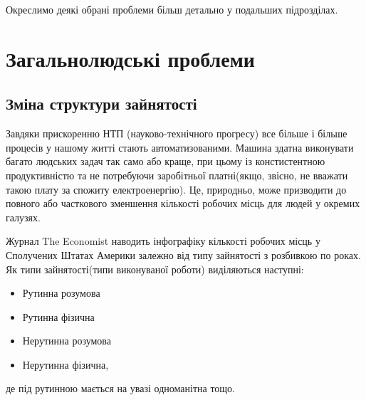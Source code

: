         Окреслимо деякі обрані проблеми більш детально у подальших підрозділах.

    \chapter{Загальнолюдські проблеми}\label{sec:world}


    \section{Зміна структури зайнятості}

        Завдяки прискоренню НТП (науково-технічного прогресу) все більше і більше процесів 
        у нашому житті стають автоматизованими. Машина здатна виконувати багато людських задач так само або краще,
        при цьому із констистентною продуктивністю та не потребуючи заробітньої платні(якщо, звісно, не вважати такою плату за
        спожиту електроенергію). Це, природньо, може призводити до повного або часткового зменшення кількості робочих місць для
        людей у окремих галузях.

        Журнал The Economist наводить інфографіку \cite{econinfo} кількості робочих місць у Сполучених Штатах Америки залежно від типу зайнятості
        з розбивкою по роках. Як типи зайнятості(типи виконуваної роботи) виділяються наступні:

        \begin{itemize}
            \item Рутинна розумова
            \item Рутинна фізична
            \item Нерутинна розумова
            \item Нерутинна фізична,
        \end{itemize}

        де під рутинною мається на увазі одноманітна тощо.

          

